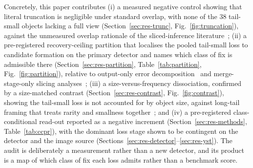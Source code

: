 Concretely, this paper contributes (i) a measured negative control showing that literal truncation is negligible under standard overlap, with none of the 38 tail-small objects lacking a full view (Section~\ref{sec:res-trunc}, Fig.~\ref{fig:truncation}), against the unmeasured overlap rationale of the sliced-inference literature~\citep{akyon2022sahi,unel2019tiling}; (ii) a pre-registered recovery-ceiling partition that localises the pooled tail-small loss to candidate formation on the primary detector and names which class of fix is admissible there (Section~\ref{sec:res-partition}, Table~\ref{tab:partition}, Fig.~\ref{fig:partition}), relative to output-only error decomposition~\citep{hoiem2012diagnosing,bolya2020tide} and merge-stage-only slicing analyses~\citep{na2026crossview}; (iii) a size-versus-frequency dissociation, confirmed by a size-matched contrast (Section~\ref{sec:res-contrast}, Fig.~\ref{fig:contrast}), showing the tail-small loss is not accounted for by object size, against long-tail framing that treats rarity and smallness together~\citep{pan2021norcal}; and (iv) a pre-registered class-conditional read-out reported as a negative increment (Section~\ref{sec:res-methods}, Table~\ref{tab:ccpr}), with the dominant loss stage shown to be contingent on the detector and the image source (Sections~\ref{sec:res-detector}--\ref{sec:res-yst}). The audit is deliberately a measurement rather than a new detector, and its product is a map of which class of fix each loss admits rather than a benchmark score.
